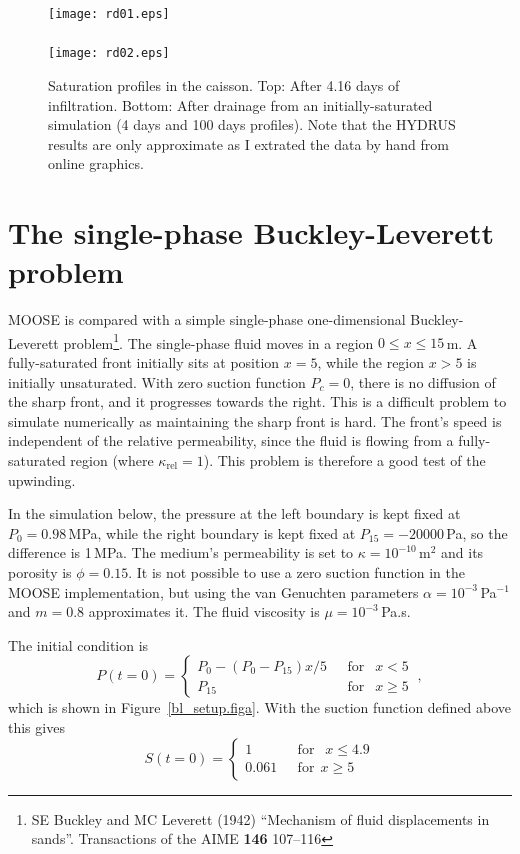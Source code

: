 \documentclass[]{scrreprt}
\begin{document}
\begin{figure}[htb]
\begin{center}
\texttt{[image: rd01.eps]} \\
$\mbox{}$\\
\texttt{[image: rd02.eps]}
\caption{Saturation profiles in the caisson.  Top: After 4.16 days of
  infiltration.  Bottom: After drainage from an initially-saturated
  simulation (4 days and 100 days profiles).  Note that the HYDRUS
  results are only approximate as I extrated the data by hand from
  online graphics.}
\label{rd.result.fig}
\end{center}
\end{figure}


\chapter{The single-phase Buckley-Leverett problem}
\label{bl}

MOOSE is compared with a simple single-phase one-dimensional
Buckley-Leverett problem\footnote{SE Buckley and MC Leverett (1942)
  ``Mechanism of fluid displacements in sands''.  Transactions of the
  AIME {\bf 146} 107--116}.  The single-phase fluid moves in a region
$0\leq x\leq 15$\,m.  A fully-saturated front initially sits at
position $x=5$, while the region $x>5$ is initially unsaturated.  With
zero suction function $P_{c} = 0$, there is no diffusion of the sharp
front, and it progresses towards the right.  This is a difficult
problem to simulate numerically as maintaining the sharp front is
hard.  The front's speed is independent of the relative permeability,
since the fluid is flowing from a fully-saturated region (where
$\kappa_{\mathrm{rel}}=1$).  This problem is therefore a good test of
the upwinding.


In the simulation below, the pressure at the left boundary is kept
fixed at $P_{0}=0.98$\,MPa, while the right boundary is kept fixed at
$P_{15}=-20000$\,Pa, so the difference is 1\,MPa.  The medium's
permeability is set to $\kappa = 10^{-10}\,\mathrm{m}^{2}$ and its
porosity is $\phi = 0.15$.  It is not possible to use a zero suction
function in the MOOSE implementation, but using the van Genuchten
parameters $\alpha = 10^{-3}$\,Pa$^{-1}$ and $m=0.8$ approximates it.
The fluid viscosity is $\mu = 10^{-3}$\,Pa.s.

The initial condition is
\begin{equation}
P(t=0) = \left\{
\begin{array}{ll}
P_{0} - (P_{0}-P_{15})x/5 & \ \ \ \mbox{for }\ \ x<5 \\
P_{15} & \ \ \ \mbox{for }\ \ x\geq 5  
\end{array}
\right. \ ,
\end{equation}
which is shown in
Figure~\ref{bl_setup.figa}.  With the suction function defined above
this gives
\begin{equation}
S(t=0) = \left\{
\begin{array}{ll}
1 & \ \ \ \mbox{for }\ \ x\leq 4.9 \\
0.061 & \ \ \ \mbox{for} \ \ x \geq 5
\end{array}
\right.
\end{equation}
\end{document}
